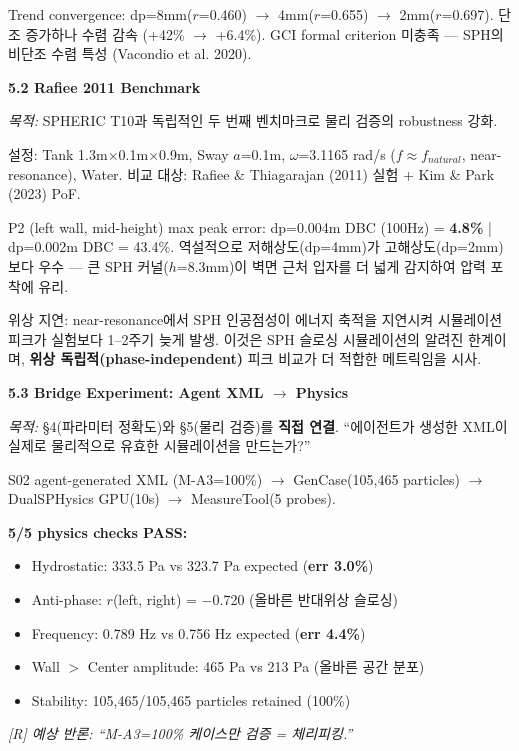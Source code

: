 \documentclass[12pt,a4paper]{article}
\begin{document}
Trend convergence: dp=8mm($r$=0.460) $\rightarrow$ 4mm($r$=0.655) $\rightarrow$ 2mm($r$=0.697).
단조 증가하나 수렴 감속 (+42\% $\rightarrow$ +6.4\%).
GCI formal criterion 미충족 --- SPH의 비단조 수렴 특성 (Vacondio et al. 2020).

\textbf{5.2 Rafiee 2011 Benchmark}

\textit{목적:} SPHERIC T10과 독립적인 두 번째 벤치마크로 물리 검증의 robustness 강화.

설정: Tank 1.3m$\times$0.1m$\times$0.9m, Sway $a$=0.1m,
$\omega$=3.1165 rad/s ($f \approx f_{natural}$, near-resonance), Water.
비교 대상: Rafiee \& Thiagarajan (2011) 실험 + Kim \& Park (2023) PoF.

P2 (left wall, mid-height) max peak error:
dp=0.004m DBC (100Hz) = \textbf{4.8\%} |
dp=0.002m DBC = 43.4\%.
역설적으로 저해상도(dp=4mm)가 고해상도(dp=2mm)보다 우수 ---
큰 SPH 커널($h$=8.3mm)이 벽면 근처 입자를 더 넓게 감지하여 압력 포착에 유리.

위상 지연: near-resonance에서 SPH 인공점성이 에너지 축적을 지연시켜
시뮬레이션 피크가 실험보다 1--2주기 늦게 발생.
이것은 SPH 슬로싱 시뮬레이션의 알려진 한계이며,
\textbf{위상 독립적(phase-independent)} 피크 비교가 더 적합한 메트릭임을 시사.

\textbf{5.3 Bridge Experiment: Agent XML $\rightarrow$ Physics}

\textit{목적:} §4(파라미터 정확도)와 §5(물리 검증)를 \textbf{직접 연결}.
``에이전트가 생성한 XML이 실제로 물리적으로 유효한 시뮬레이션을 만드는가?''

S02 agent-generated XML (M-A3=100\%) $\rightarrow$ GenCase(105,465 particles)
$\rightarrow$ DualSPHysics GPU(10s) $\rightarrow$ MeasureTool(5 probes).

\textbf{5/5 physics checks PASS:}
\begin{itemize}[nosep]
\item Hydrostatic: 333.5 Pa vs 323.7 Pa expected (\textbf{err 3.0\%})
\item Anti-phase: $r$(left, right) = $-$0.720 (올바른 반대위상 슬로싱)
\item Frequency: 0.789 Hz vs 0.756 Hz expected (\textbf{err 4.4\%})
\item Wall $>$ Center amplitude: 465 Pa vs 213 Pa (올바른 공간 분포)
\item Stability: 105,465/105,465 particles retained (100\%)
\end{itemize}

{\color{reviewer}\textit{[R] 예상 반론: ``M-A3=100\% 케이스만 검증 = 체리피킹.''}}
\end{document}
